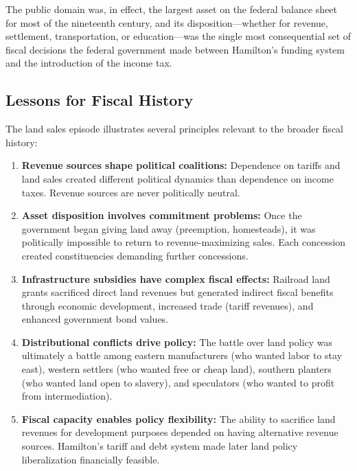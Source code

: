 \documentclass[12pt]{article}
\begin{document}
The public domain was, in effect, the largest asset on the federal balance sheet for most of the nineteenth century, and its disposition---whether for revenue, settlement, transportation, or education---was the single most consequential set of fiscal decisions the federal government made between Hamilton's funding system and the introduction of the income tax.

\subsection{Lessons for Fiscal History}

The land sales episode illustrates several principles relevant to the broader fiscal history:

\begin{enumerate}
\item \textbf{Revenue sources shape political coalitions:} Dependence on tariffs and land sales created different political dynamics than dependence on income taxes.  Revenue sources are never politically neutral.

\item \textbf{Asset disposition involves commitment problems:} Once the government began giving land away (preemption, homesteads), it was politically impossible to return to revenue-maximizing sales.  Each concession created constituencies demanding further concessions.

\item \textbf{Infrastructure subsidies have complex fiscal effects:} Railroad land grants sacrificed direct land revenues but generated indirect fiscal benefits through economic development, increased trade (tariff revenues), and enhanced government bond values.

\item \textbf{Distributional conflicts drive policy:} The battle over land policy was ultimately a battle among eastern manufacturers (who wanted labor to stay east), western settlers (who wanted free or cheap land), southern planters (who wanted land open to slavery), and speculators (who wanted to profit from intermediation).

\item \textbf{Fiscal capacity enables policy flexibility:} The ability to sacrifice land revenues for development purposes depended on having alternative revenue sources.  Hamilton's tariff and debt system made later land policy liberalization financially feasible.
\end{enumerate}



\end{document}
